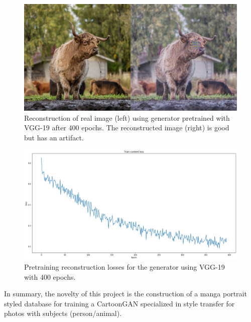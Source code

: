 \documentclass{article}
\begin{document}
\begin{figure}[b]
  \includegraphics[width=\textwidth]{figure/pre_train_A.png}
  \caption{Reconstruction of real image (left) using generator pretrained with VGG-19 after 400 epochs. The reconstructed image (right) is good but has an artifact.}
  \label{fig:pretrain}
\end{figure}

\begin{figure}[b]
  \includegraphics[width=\textwidth]{figure/pre_train_loss.png}
  \caption{Pretraining reconstruction losses for the generator using VGG-19 with 400 epochs.}
  \label{fig:pretrain_loss}
\end{figure}

In summary, the novelty of this project is the construction of a manga portrait styled database for training a CartoonGAN specialized in style transfer for photos with subjects (person/animal).
\end{document}
